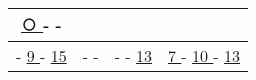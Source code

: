 \documentclass[12pt]{amsart}
\theoremstyle{definition}
\begin{document}
\begin{center}
\begin{tabular}{| c | c | c | c |}
 \underline{ \textcircled{\hspace{.1in}} } - \underline{ \hspace{.1in} } - \underline{ \hspace{.1in} }\\
 \hline
 \underline{ \hspace{.1in} } - \underline{ 9 } - \underline{ 15 }&  
 \underline{ \hspace{.1in} } - \underline{ \hspace{.1in} } - \underline{ \hspace{.1in} } &  
 \underline{ \hspace{.1in} } - \underline{ \hspace{.1in} } - \underline{ 13 } &  
 \underline{ 7 } - \underline{ 10 } - \underline{ 13 }\\
 \hline
\end{tabular}
\end{center}
\end{document}
